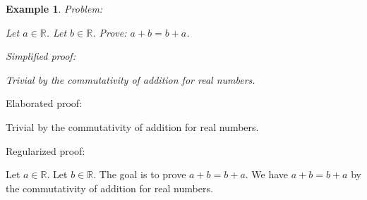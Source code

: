 \documentclass{article}
\newtheorem{example}{Example}
\begin{document}
\begin{example}
Problem:
\begin{tcolorbox}[colback=yellow!10, width=\linewidth]
Let $a\in\mathbb{R}$. Let $b\in\mathbb{R}$. Prove: $a+b=b+a$.
\end{tcolorbox}

Simplified proof:
\begin{tcolorbox}[colback=blue!10, width=\linewidth]
Trivial by the commutativity of addition for real numbers.
\end{tcolorbox}
\end{example}

Elaborated proof:
\begin{tcolorbox}[colback=green!10, width=\linewidth]
Trivial by the commutativity of addition for real numbers.
\end{tcolorbox}

Regularized proof:
\begin{tcolorbox}[colback=red!10, width=\linewidth]
Let $a\in\mathbb{R}$.
Let $b\in\mathbb{R}$.
The goal is to prove $a+b=b+a$.
We have $a+b=b+a$ by the commutativity of addition for real numbers.
\end{tcolorbox}
\end{document}
